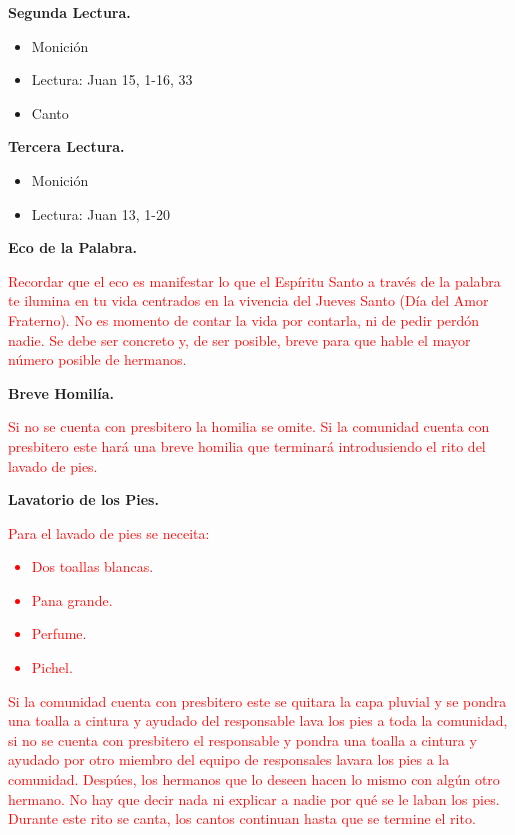 \documentclass[12pt, letterpaper]{article}
\begin{document}
{{{{{    \large {\bfseries Segunda Lectura.}
    \begin{itemize}
     \item \normalsize Monición
     \item Lectura: Juan 15, 1-16, 33
     \item Canto
    \end{itemize}

    \large {\bfseries Tercera Lectura.}
    \begin{itemize}
     \item \normalsize Monición
     \item Lectura: Juan 13, 1-20
    \end{itemize}

    \large {\bfseries Eco de la Palabra.}\\
    \normalsize {\textcolor{red}{Recordar que el eco es manifestar lo que el Espíritu Santo a través de la palabra te ilumina en tu vida centrados en la vivencia del Jueves Santo (Día del Amor Fraterno). No es momento de contar la vida por contarla, ni de pedir perdón nadie. Se debe ser concreto y, de ser posible, breve para que hable el mayor número posible de hermanos.}

    \large {\bfseries Breve Homilía.}\\
    \normalsize {\textcolor{red}{Si no se cuenta con presbitero la homilia se omite. Si la comunidad cuenta con presbitero este hará una breve homilia que terminará introdusiendo el rito del lavado de pies.}

    \large {\bfseries Lavatorio de los Pies.}\\
    \normalsize {\textcolor{red}{Para el lavado de pies se neceita:}
    \textcolor{red}{
        \begin{itemize}
            \item Dos toallas blancas.
            \item Pana grande.
            \item Perfume.
            \item Pichel.
        \end{itemize}
    }

    \normalsize {\textcolor{red}{Si la comunidad cuenta con presbitero este se quitara la capa pluvial y se pondra una toalla a cintura y ayudado del responsable lava los pies a toda la comunidad, si no se cuenta con presbitero el responsable y pondra una toalla a cintura y ayudado por otro miembro del equipo de responsales lavara los pies a la comunidad. Despúes, los hermanos que lo deseen hacen lo mismo con algún otro hermano. No hay que decir nada ni explicar a nadie por qué se le laban los pies. Durante este rito se canta, los cantos continuan hasta que se termine el rito.}

}}}}}}}}}
\end{document}
